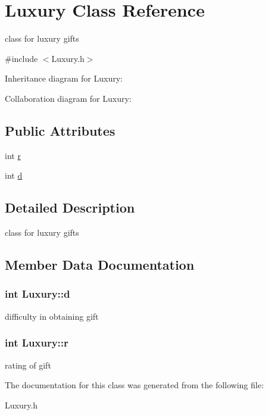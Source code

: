 \hypertarget{classLuxury}{}\section{Luxury Class Reference}
\label{classLuxury}


class for luxury gifts  




{\ttfamily \#include $<$Luxury.\+h$>$}



Inheritance diagram for Luxury\+:


Collaboration diagram for Luxury\+:
\subsection*{Public Attributes}
\begin{DoxyCompactItemize}
\item 
int \hyperlink{classLuxury_a6fb78a2427ec2d375199c5be8d64032c}{r}
\item 
int \hyperlink{classLuxury_a9d43b7a4b373a04d144ba979368873df}{d}
\end{DoxyCompactItemize}


\subsection{Detailed Description}
class for luxury gifts 

\subsection{Member Data Documentation}
\subsubsection[{\texorpdfstring{d}{d}}]{\setlength{\rightskip}{0pt plus 5cm}int Luxury\+::d}\hypertarget{classLuxury_a9d43b7a4b373a04d144ba979368873df}{}\label{classLuxury_a9d43b7a4b373a04d144ba979368873df}
difficulty in obtaining gift 
\subsubsection[{\texorpdfstring{r}{r}}]{\setlength{\rightskip}{0pt plus 5cm}int Luxury\+::r}\hypertarget{classLuxury_a6fb78a2427ec2d375199c5be8d64032c}{}\label{classLuxury_a6fb78a2427ec2d375199c5be8d64032c}
rating of gift 

The documentation for this class was generated from the following file\+:\begin{DoxyCompactItemize}
\item 
Luxury.\+h\end{DoxyCompactItemize}
